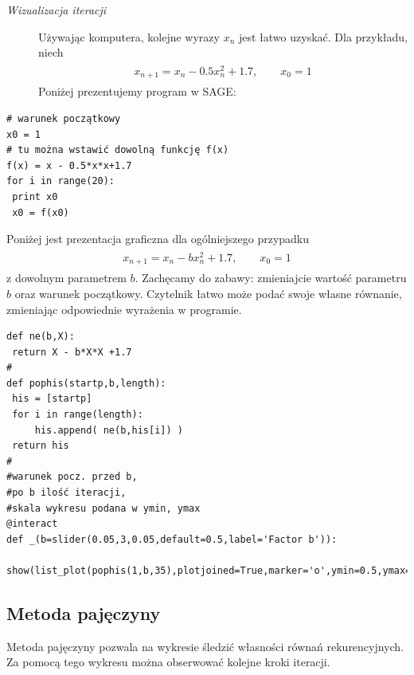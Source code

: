\documentclass[a4paper,12pt,polish]{sphinxmanual}
\begin{document}
\begin{description}
\item[{\emph{Wizualizacja iteracji}}] \leavevmode
Używając komputera, kolejne wyrazy $x_n$ jest łatwo uzyskać. Dla przykładu, niech
\label{ch1/chI031:equation-eqn3}\begin{gather}
\begin{split}x_{n+1} = x_n - 0.5  x_{n}^2 +1.7, \qquad x_0 = 1\end{split}\label{ch1/chI031-eqn3}
\end{gather}
Poniżej prezentujemy program w SAGE:

\end{description}


\begin{verbatim}
# warunek początkowy
x0 = 1
# tu można wstawić dowolną funkcję f(x)
f(x) = x - 0.5*x*x+1.7
for i in range(20):
 print x0
 x0 = f(x0)
\end{verbatim}


Poniżej jest prezentacja graficzna dla ogólniejszego przypadku
\label{ch1/chI031:equation-eqn4}\begin{gather}
\begin{split}x_{n+1} = x_n - b  x_{n}^2 +1.7, \qquad x_0 = 1\end{split}\label{ch1/chI031-eqn4}
\end{gather}
z dowolnym parametrem $b$. Zachęcamy do zabawy: zmieniajcie wartość parametru $b$ oraz warunek początkowy. Czytelnik łatwo może podać swoje własne równanie, zmieniając odpowiednie wyrażenia w programie.


\begin{verbatim}
def ne(b,X):
 return X - b*X*X +1.7
#
def pophis(startp,b,length):
 his = [startp]
 for i in range(length):
     his.append( ne(b,his[i]) )
 return his
#
#warunek pocz. przed b,
#po b ilość iteracji,
#skala wykresu podana w ymin, ymax
@interact
def _(b=slider(0.05,3,0.05,default=0.5,label='Factor b')):
 show(list_plot(pophis(1,b,35),plotjoined=True,marker='o',ymin=0.5,ymax=3))
\end{verbatim}



\subsection{Metoda pajęczyny}
\label{ch1/chI031:metoda-pajeczyny}
Metoda pajęczyny pozwala na wykresie śledzić własności równań rekurencyjnych.   Za pomocą tego wykresu  można obserwować kolejne kroki iteracji.
\end{document}
